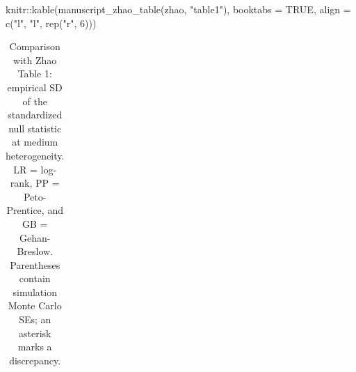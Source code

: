\documentclass[
  12pt]{article}
\newenvironment{Shaded}{\begin{snugshade}}{\end{snugshade}}
\newcommand{\AttributeTok}[1]{\textcolor[rgb]{0.40,0.45,0.13}{#1}}
\newcommand{\ConstantTok}[1]{\textcolor[rgb]{0.56,0.35,0.01}{#1}}
\newcommand{\DecValTok}[1]{\textcolor[rgb]{0.68,0.00,0.00}{#1}}
\newcommand{\FunctionTok}[1]{\textcolor[rgb]{0.28,0.35,0.67}{#1}}
\newcommand{\NormalTok}[1]{\textcolor[rgb]{0.00,0.23,0.31}{#1}}
\newcommand{\SpecialCharTok}[1]{\textcolor[rgb]{0.37,0.37,0.37}{#1}}
\newcommand{\StringTok}[1]{\textcolor[rgb]{0.13,0.47,0.30}{#1}}
\begin{document}
\begin{Shaded}
\begin{Highlighting}[]
\NormalTok{knitr}\SpecialCharTok{::}\FunctionTok{kable}\NormalTok{(}\FunctionTok{manuscript\_zhao\_table}\NormalTok{(zhao, }\StringTok{"table1"}\NormalTok{), }\AttributeTok{booktabs =} \ConstantTok{TRUE}\NormalTok{,}
             \AttributeTok{align =} \FunctionTok{c}\NormalTok{(}\StringTok{"l"}\NormalTok{, }\StringTok{"l"}\NormalTok{, }\FunctionTok{rep}\NormalTok{(}\StringTok{"r"}\NormalTok{, }\DecValTok{6}\NormalTok{)))}
\end{Highlighting}
\end{Shaded}

{

\begin{longtable}[]{@{}
  >{\raggedright\arraybackslash}p{}
  >{\raggedright\arraybackslash}p{}
  >{\raggedleft\arraybackslash}p{}
  >{\raggedleft\arraybackslash}p{}
  >{\raggedleft\arraybackslash}p{}
  >{\raggedleft\arraybackslash}p{}
  >{\raggedleft\arraybackslash}p{}@{}}

\caption{\label{tbl-zhao-null-sd}Comparison with Zhao Table 1: empirical
SD of the standardized null statistic at medium heterogeneity. LR =
log-rank, PP = Peto-Prentice, and GB = Gehan-Breslow. Parentheses
contain simulation Monte Carlo SEs; an asterisk marks a discrepancy.}

\tabularnewline


\end{longtable}}
\end{document}

